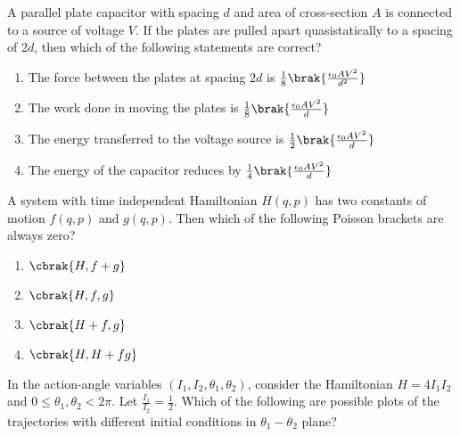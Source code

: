 \iffalse
\chapter{2022}
\author{EE24BTECH11040}
\section{ph}
\fi

\item A parallel plate capacitor with spacing $d$ and area of cross-section $A$ is connected to a source of voltage $V$. If the plates are pulled apart quasistatically to a spacing
of 2$d$, then which of the following statements are correct? 

\begin{enumerate}
\item The force between the plates at spacing $2d$ is $\frac{1}{8}\brak{\frac{\epsilon_0AV^2}{d^2}}$
\item The work done in moving the plates is $\frac{1}{8}\brak{\frac{\epsilon_0AV^2}{d}}$
\item The energy transferred to the voltage source is $\frac{1}{2}\brak{\frac{\epsilon_0AV^2}{d}}$
\item The energy of the capacitor reduces by $\frac{1}{4}\brak{\frac{\epsilon_0AV^2}{d}}$
\end{enumerate}

\item A system with time independent Hamiltonian $H(q,p)$ has two constants of motion $f(q,p)$ and $g(q,p)$. Then which of the following Poisson brackets are always zero?

\begin{enumerate}
\item $\cbrak{H,f+g}$
\item $\cbrak{H,{f,g}}$
\item $\cbrak{H+f,g}$
\item $\cbrak{H,H+fg}$
\end{enumerate}

\item In the action-angle variables $(I_1,I_2,\theta_1,\theta_2)$, consider the Hamiltonian $H=4I_1I_2$ and $0\leq\theta_1,\theta_2<2\pi$. Let $\frac{I_1}{I_2}=\frac{1}{2}$. Which of the following are possible plots of the trajectories with different initial conditions in $\theta_1-\theta_2$ plane?

